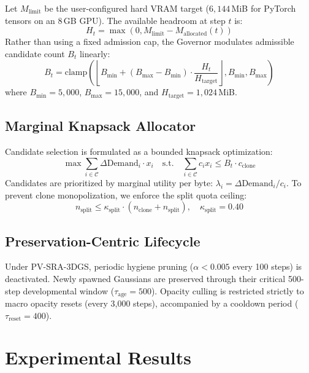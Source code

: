 \documentclass[10pt,twocolumn,letterpaper]{article}
\begin{document}
Let $M_{\text{limit}}$ be the user-configured hard VRAM target ($6{,}144$\,MiB for PyTorch tensors on an 8\,GB GPU). The available headroom at step $t$ is:
\begin{equation}
H_t = \max\left(0, M_{\text{limit}} - M_{\text{allocated}}(t)\right)
\end{equation}
Rather than using a fixed admission cap, the Governor modulates admissible candidate count $B_t$ linearly:
\begin{equation}
B_t = \text{clamp}\left(\left\lfloor B_{\min} + (B_{\max} - B_{\min}) \cdot \frac{H_t}{H_{\text{target}}}\right\rfloor, B_{\min}, B_{\max}\right)
\end{equation}
where $B_{\min} = 5{,}000$, $B_{\max} = 15{,}000$, and $H_{\text{target}} = 1{,}024$\,MiB.

\subsection{Marginal Knapsack Allocator}

Candidate selection is formulated as a bounded knapsack optimization:
\begin{equation}
\max \sum_{i \in \mathcal{C}} \Delta \text{Demand}_i \cdot x_i \quad \text{s.t.} \quad \sum_{i \in \mathcal{C}} c_i x_i \le B_t \cdot c_{\text{clone}}
\end{equation}
Candidates are prioritized by marginal utility per byte: $\lambda_i = \Delta \text{Demand}_i / c_i$. To prevent clone monopolization, we enforce the split quota ceiling:
\begin{equation}
n_{\text{split}} \le \kappa_{\text{split}} \cdot (n_{\text{clone}} + n_{\text{split}}), \quad \kappa_{\text{split}} = 0.40
\end{equation}

\subsection{Preservation-Centric Lifecycle}

Under PV-SRA-3DGS, periodic hygiene pruning ($\alpha < 0.005$ every 100 steps) is deactivated. Newly spawned Gaussians are preserved through their critical 500-step developmental window ($\tau_{\text{age}} = 500$). Opacity culling is restricted strictly to macro opacity resets (every 3,000 steps), accompanied by a cooldown period ($\tau_{\text{reset}} = 400$).

\section{Experimental Results}
\end{document}
